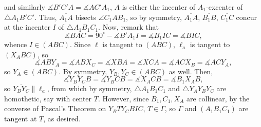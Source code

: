 and similarly $\measuredangle B'C'A=\measuredangle AC'A_1$, $A$ is either the incenter of $A_1$-excenter of $\triangle A_1B'C'$. Thus, $\overline{A_1A}$ bisects $\angle C_1AB_1$, so by symmetry, $\overline{A_1A}$, $\overline{B_1B}$, $\overline{C_1C}$ concur at the incenter $I$ of $\triangle A_1B_1C_1$. Now, remark that \[\measuredangle BAC=90^\circ-\measuredangle B'A_1I=\measuredangle B_1IC=\measuredangle BIC,\]
whence $I\in(ABC)$. Since $\ell$ is tangent to $(ABC)$, $\ell_a$ is tangent to $(X_ABC)$, so \[\measuredangle ABY_A=\measuredangle ABX_C=\measuredangle XBA=\measuredangle XCA=\measuredangle ACX_B=\measuredangle ACY_A,\]
so $Y_A\in(ABC)$. By symmetry, $Y_B,Y_C\in(ABC)$ as well. Then, \[\measuredangle Y_BY_CB=\measuredangle Y_BCB=\measuredangle X_ACB=\measuredangle B_1X_AB,\]
so $\overline{Y_BY_C}\parallel\ell_a$, from which by symmetry, $\triangle A_1B_1C_1$ and $\triangle Y_AY_BY_C$ are homothetic, say with center $T$. However, since $B_1,C_1,X_A$ are collinear, by the converse of Pascal's Theorem on $Y_BTY_CBIC$, $T\in\Gamma$, so $\Gamma$ and $(A_1B_1C_1)$ are tangent at $T$, as desired.
